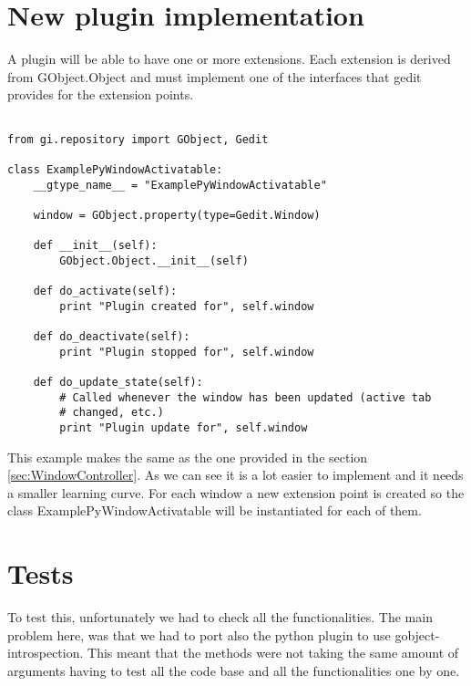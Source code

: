 \section{New plugin implementation}

A plugin will be able to have one or more extensions. Each extension is derived from GObject.Object and must implement one of the interfaces that gedit provides for the extension points.

\begin{lstlisting}[style=python]

from gi.repository import GObject, Gedit

class ExamplePyWindowActivatable:
    __gtype_name__ = "ExamplePyWindowActivatable"

    window = GObject.property(type=Gedit.Window)

    def __init__(self):
        GObject.Object.__init__(self)

    def do_activate(self):
        print "Plugin created for", self.window

    def do_deactivate(self):
        print "Plugin stopped for", self.window

    def do_update_state(self):
        # Called whenever the window has been updated (active tab
        # changed, etc.)
        print "Plugin update for", self.window

\end{lstlisting}

This example makes the same as the one provided in the section \ref{sec:WindowController}. As we can see it is a lot easier to implement and it needs a smaller learning curve. For each window a new extension point is created so the class ExamplePyWindowActivatable will be instantiated for each of them.

\section{Tests}

To test this, unfortunately we had to check all the functionalities. The main problem here, was that we had to port also the python plugin to use gobject-introspection. This meant that the methods were not taking the same amount of arguments having to test all the code base and all the functionalities one by one.

